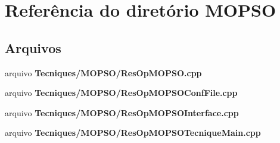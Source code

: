 \section{Referência do diretório M\+O\+P\+SO}
\label{dir_b321ce7158a60b59df904933976d16ce}
\subsection*{Arquivos}
\begin{DoxyCompactItemize}
\item 
arquivo {\bf Tecniques/\+M\+O\+P\+S\+O/\+Res\+Op\+M\+O\+P\+S\+O.\+cpp}
\item 
arquivo {\bf Tecniques/\+M\+O\+P\+S\+O/\+Res\+Op\+M\+O\+P\+S\+O\+Conf\+File.\+cpp}
\item 
arquivo {\bf Tecniques/\+M\+O\+P\+S\+O/\+Res\+Op\+M\+O\+P\+S\+O\+Interface.\+cpp}
\item 
arquivo {\bf Tecniques/\+M\+O\+P\+S\+O/\+Res\+Op\+M\+O\+P\+S\+O\+Tecnique\+Main.\+cpp}
\end{DoxyCompactItemize}
